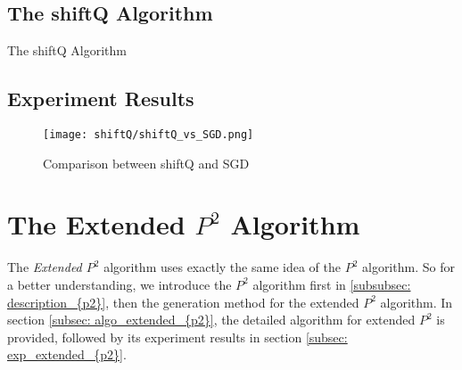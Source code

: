 \subsection{The shiftQ Algorithm}
\begin{algorithm}
    \caption{The shiftQ Algorithm}\label{alg:multi_shiftQ}
        \begin{algorithmic}[1]
        \end{algorithmic}
\end{algorithm}
\subsection{Experiment Results}

\begin{figure*}[h!]
	\texttt{[image: shiftQ/shiftQ\_vs\_SGD.png]}
	\caption{Comparison between shiftQ and SGD}
\end{figure*}

\fi


\section{The Extended $P^2$ Algorithm}
\label{sec: multi_{p2}}

The \textit{Extended $P^2$} algorithm uses exactly the same idea of the $P^2$ algorithm. So for a better understanding, we introduce the $P^2$ algorithm first in \ref{subsubsec: description_{p2}}, then the generation method for the extended $P^2$ algorithm.
In section \ref{subsec: algo_extended_{p2}}, the detailed algorithm for extended $P^2$ is provided, followed by its experiment results in section \ref{subsec: exp_extended_{p2}}.

